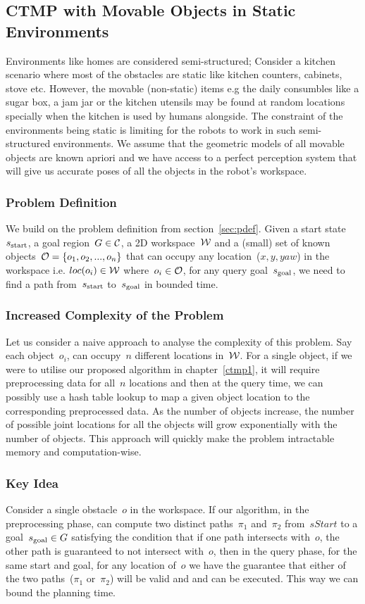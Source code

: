 \documentclass[a4paper,10pt]{article}
\begin{document}
\subsection{CTMP with Movable Objects in Static Environments}
Environments like homes are considered semi-structured; Consider a kitchen scenario where most of the obstacles are static like kitchen counters, cabinets, stove etc. However, the movable (non-static) items e.g the daily consumbles like a sugar box, a jam jar or the kitchen utensils may be found at random locations specially when the kitchen is used by humans alongside.
The constraint of the environments being static is limiting for the robots to work in such semi-structured environments. We assume that the geometric models of all movable objects are known apriori and we have access to a perfect perception system that will give us accurate poses of all the objects in the robot's workspace.

\subsubsection{Problem Definition}
We build on the problem definition from section~\ref{sec:pdef}. Given a start state~$s_{\text{start}}$, a goal region~$G \in \mathcal{C}$, a 2D workspace~$\mathcal{W}$ and a (small) set of known objects~$\mathcal{O} = \{o_1, o_2, ..., o_n\}$ that can occupy any location~($x,y,yaw$) in the workspace i.e. $loc(o_i) \in \mathcal{W}$ where~$o_i \in \mathcal{O}$, for any query goal~$s_{\text{goal}}$, we need to find a path from~$s_{\text{start}}$ to~$s_{\text{goal}}$ in bounded time.

\subsubsection{Increased Complexity of the Problem}
Let us consider a naive approach to analyse the complexity of this problem. Say each object~$o_i$, can occupy~$n$ different locations in~$\mathcal{W}$. For a single object, if we were to utilise our proposed algorithm in chapter~\ref{ctmp1}, it will require preprocessing data for all~$n$ locations and then at the query time, we can possibly use a hash table lookup to map a given object location to the corresponding preprocessed data. As the number of objects increase, the number of possible joint locations for all the objects will grow exponentially with the number of objects. This approach will quickly make the problem intractable memory and computation-wise.

\subsubsection{Key Idea}
Consider a single obstacle~$o$ in the workspace. If our algorithm, in the preprocessing phase, can compute two distinct paths~$\pi_1$ and~$\pi_2$ from~$sStart$ to a goal~$s_{\text{goal}} \in G$ satisfying the condition that if one path intersects with~$o$, the other path is guaranteed to not intersect with~$o$, then in the query phase, for the same start and goal, for any location of~$o$ we have the guarantee that either of the two paths~($\pi_1$ or~$\pi_2$) will be valid and and can be executed. This way we can bound the planning time.
\end{document}
